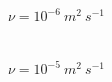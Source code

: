 \documentclass[serif,compress, blue, 11pt]{beamer}
\begin{document}
{\begin{figure}
\begin{minipage}{0.47\linewidth}
\tiny{$\nu=10^{-6}\ m^2\ s^{-1}$}
\end{minipage}
\begin{minipage}{0.47\linewidth}
 \\
\tiny{$\nu=10^{-5}\ m^2\ s^{-1}$}
\end{minipage}
\end{figure}
}
\end{document}
